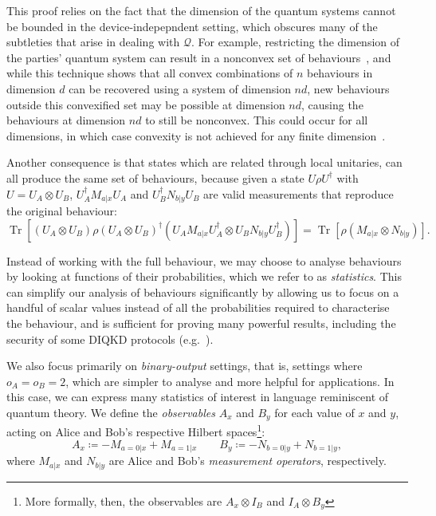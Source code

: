 \documentclass[10pt, a4paper]{article}
\numberwithin{equation}{section} %
\theoremstyle{definition}
\theoremstyle{plain}
\newcommand{\?}{\mathrel{?}} %
\newcommand{\Tr}[2][]{\mathop{\mathrm{Tr}#1}\left[ #2 \right]} %
\newcommand{\Qs}{\mathcal{Q}}
\begin{document}
    This proof relies on the fact that the dimension of the quantum systems cannot be bounded in the device-indepepndent setting, which obscures many of the subtleties that arise in dealing with \(\Qs\). For example, restricting the dimension of the parties' quantum system can result in a nonconvex set of behaviours~\cite{FiniteDimNonconvex}, and while this technique shows that all convex combinations of \(n\) behaviours in dimension \(d\) can be recovered using a system of dimension \(nd\), new behaviours outside this convexified set may be possible at dimension \(nd\), causing the behaviours at dimension \(nd\) to still be nonconvex. This could occur for all dimensions, in which case convexity is not achieved for any finite dimension~\cite[Sec. 4]{FiniteDimNonconvex}.

    Another consequence is that states which are related through local unitaries, can all produce the same set of behaviours, because given a state \(U\rho{U^{\dagger}}\) with \(U = U_A \otimes U_B\), \(U_A^{\dagger} M_{a|x} U_A\) and \(U_B^{\dagger} N_{b|y} U_B\) are valid measurements that reproduce the original behaviour:
    \begin{equation}
      \Tr{{(U_A \otimes U_B)} \rho {(U_A \otimes U_B)}^{\dagger} \left(U_A M_{a|x} U_A^{\dagger} \otimes U_B N_{b|y} U_B^{\dagger} \right)} = \Tr{ \rho \left(M_{a|x} \otimes N_{b|y} \right)}.
    \end{equation}

    Instead of working with the full behaviour, we may choose to analyse behaviours by looking at functions of their probabilities, which we refer to as \emph{statistics}. This can simplify our analysis of behaviours significantly by allowing us to focus on a handful of scalar values instead of all the probabilities required to characterise the behaviour, and is sufficient for proving many powerful results, including the security of some DIQKD protocols (e.g.~\cite{DIQKD_StdProto}).

    We also focus primarily on \emph{binary-output} settings, that is, settings where \(o_A = o_B = 2\), which are simpler to analyse and more helpful for applications. In this case, we can express many statistics of interest in language reminiscent of quantum theory. We define the \emph{observables} \(A_x\) and \(B_y\) for each value of \(x\) and \(y\), acting on Alice and Bob's respective Hilbert spaces\footnote{More formally, then, the observables are \(A_x \otimes I_B\) and \(I_A \otimes B_y\)}:
    \begin{equation} A_x \coloneqq -M_{a=0|x} + M_{a=1|x} \qquad B_y \coloneqq -N_{b=0|y} + N_{b=1|y}, \end{equation}
    where \(M_{a|x}\) and \(N_{b|y}\) are Alice and Bob's \emph{measurement operators}, respectively.
\end{document}
